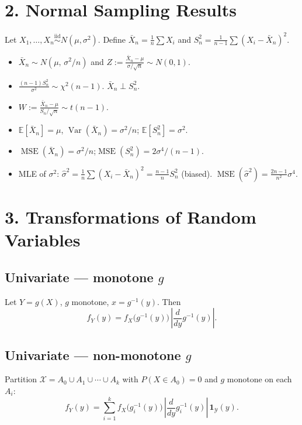 \documentclass[11pt]{article}
\newcommand{\bbE}{\mathbb{E}}
\newcommand{\Var}{\operatorname{Var}}
\newcommand{\MSE}{\operatorname{MSE}}
\begin{document}
\section*{2.\; Normal Sampling Results}

Let $X_1,\ldots,X_n\overset{\mathrm{iid}}{\sim}N(\mu,\sigma^2)$.
Define $\bar X_n=\frac{1}{n}\sum X_i$ and
$S_n^2=\frac{1}{n-1}\sum(X_i-\bar X_n)^2$.
\begin{itemize}
  \item $\bar X_n \sim N(\mu,\,\sigma^2/n)$ and $Z:=\frac{\bar
    X_n-\mu}{\sigma/\sqrt{n}}\sim N(0,1)$.
  \item $\frac{(n-1)S_n^2}{\sigma^2}\sim\chi^2(n-1)$. \quad $\bar X_n
    \perp S_n^2$.
  \item $W:=\frac{\bar X_n-\mu}{S_n/\sqrt{n}}\sim t(n-1)$.
  \item $\bbE[\bar X_n]=\mu$, $\Var(\bar X_n)=\sigma^2/n$;\quad
    $\bbE[S_n^2]=\sigma^2$.
  \item $\MSE(\bar X_n) = \sigma^2/n$;\quad $\MSE(S_n^2) = 2\sigma^4/(n-1)$.
  \item MLE of $\sigma^2$: $\hat\sigma^2=\frac{1}{n}\sum(X_i-\bar
    X_n)^2=\frac{n-1}{n}S_n^2$ (biased).
    $\MSE(\hat\sigma^2)=\frac{2n-1}{n^2}\sigma^4$.
\end{itemize}

\section*{3.\; Transformations of Random Variables}

\subsection*{Univariate --- monotone $g$}

Let $Y=g(X)$, $g$ monotone, $x=g^{-1}(y)$.  Then
\[
  f_Y(y) = f_X\!\bigl(g^{-1}(y)\bigr)\,\left|\frac{d}{dy}g^{-1}(y)\right|.
\]

\subsection*{Univariate --- non-monotone $g$}

Partition $\mathcal{X}=A_0\cup A_1\cup\cdots\cup A_k$ with $P(X\in
A_0)=0$ and $g$ monotone on each $A_i$:
\[
  f_Y(y) = \sum_{i=1}^{k}
  f_X\!\bigl(g_i^{-1}(y)\bigr)\,\left|\frac{d}{dy}g_i^{-1}(y)\right|\,\mathbf{1}_{\mathcal{Y}}(y).
\]
\end{document}
